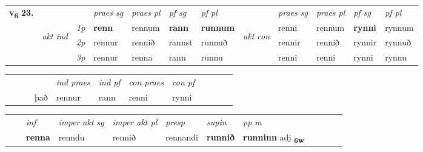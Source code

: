 \begin{tabular}{llllllllllll} \toprule
\multirow{4}{*}{{{\textbf{v{\textsubscript{6}}} \Large{\textbf{23.}}}}}  & &   &  \textit{praes sg}  & \textit{praes pl}  &\textit{ pf sg} & \textit{pf pl} &  &  \textit{praes sg}  & \textit{praes pl}  & \textit{pf sg} & \textit{pf pl } \\*
	\cmidrule{4-7} \cmidrule{9-12}
 & \multirow{3}{*}{\begin{turn}{90}\textit{akt ind}\end{turn}} & {\textit{1p}} & \textbf{renn} & rennum    & \textbf{rann} & \textbf{runnum} & \multirow{3}{*}{\begin{turn}{90}\textit{akt con}\end{turn}} &renni & rennum & \textbf{rynni} & rynnum\\*
& &  {\textit{2p}} &  rennur  & rennið   & rannst & runnuð & & rennir & rennið & rynnir & rynnuð \\*
& &  {\textit{3p}} & rennur & renna   & rann & runnu & & renni & renni& rynni & rynnu  \\*
\cmidrule{4-7} \cmidrule{9-12}
\end{tabular}


\begin{tabular}{llllllllllll}
 & &  & &  \textit{ind praes} & \textit{ind pf} & \textit{con praes} & \textit{con pf} \\*
&  & & það & rennur & rann & renni & rynni \\*
\cmidrule{5-9}
\end{tabular}


\begin{tabular}{llllllllllll}
 & & \textit{inf} & \textit{imper akt sg} & \textit{imper akt pl}   & \textit{presp} & \textit{supin}  & \textit{pp m}     \\*
  & & \textbf{renna} & renndu  & rennið   & rennandi &  \textbf{runnið}  & \textbf{runninn} adj \textbf{\textsubscript{6w}} \\*
\cmidrule{1-12}
\end{tabular}



